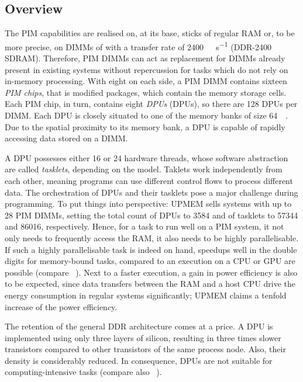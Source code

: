 \subsection{Overview}
\label{sec:prereq:arch:overview}

The \ac{PIM} capabilities are realised on, at its base, sticks of regular \ac{RAM} or, to be more precise, on \acp{DIMM} of   with a transfer rate of \qty{2400}{\mega\transfer\per\second} (\acs{DDR}-2400 \acs{SDRAM}).
Therefore, \ac{PIM} \acp{DIMM} can act as replacement for \acp{DIMM} already present in existing systems without repercussion for tasks which do not rely on in-memory processing.
With eight on each side, a \ac{PIM} \ac{DIMM} contains sixteen \emph{PIM chips}, that is modified  packages, which contain the memory storage cells.
Each \ac{PIM} chip, in turn, contains eight \emph{\aclp{DPU}} (\acsp{DPU}), so there are 128 \acp{DPU} per \ac{DIMM}.
Each \ac{DPU} is closely situated to one of the memory banks of size \qty{64}{\mebi\byte}.
Due to the spatial proximity to its memory bank, a \ac{DPU} is capable of rapidly accessing data stored on a \ac{DIMM}.

A \ac{DPU} possesses either 16 or 24 hardware threads, whose software abstraction are called \emph{tasklets}, depending on the model.
Taklets work independently from each other, meaning programs can use different control flows to process different data.
The orchestration of \acp{DPU} and their tasklets pose a major challenge during programming.
To put things into perspective:
UPMEM sells systems with up to 28 \ac{PIM} \acp{DIMM}, setting the total count of \acp{DPU} to \num{3584} and of tasklets to \num{57344} and \num{86016}, respectively.
Hence, for a task to run well on a \ac{PIM} system, it not only needs to frequently access the \ac{RAM}, it also needs to be highly parallelisable.
If such a highly parallelisable task is indeed on hand, speedups well in the double digits for memory-bound tasks, compared to an execution on a \ac{CPU} or \ac{GPU} are possible (compare \citeauthor{mutlu2022Benchmarking}~\cite{mutlu2022Benchmarking}).
Next to a faster execution, a gain in power efficiency is also to be expected, since data transfers between the \ac{RAM} and a host \ac{CPU} drive the energy consumption in regular systems significantly;
UPMEM claims a tenfold increase of the power efficiency.

The retention of the general \ac{DDR} architecture comes at a price.
A \ac{DPU} is implemented using only three layers of silicon, resulting in three times slower transistors compared to other transistors of the same process node.
Also, their density is considerably reduced.
In consequence, \acp{DPU} are not suitable for computing-intensive tasks (compare also \citeauthor{mutlu2022Benchmarking}~\cite{mutlu2022Benchmarking}).
